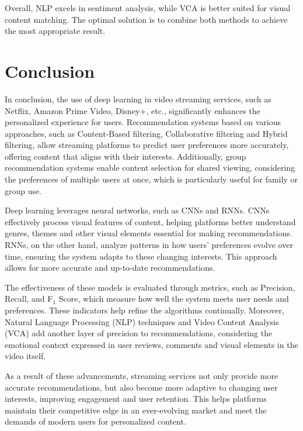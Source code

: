 \documentclass[12pt, english, a4paper]{article}
\begin{document}
Overall, NLP excels in sentiment analysis, while VCA is better suited for visual content matching. The optimal solution is to combine both methods to achieve the most appropriate result.

\section{Conclusion}

\hspace*{2em}In conclusion, the use of deep learning in video streaming services, such as Netflix, Amazon Prime Video, Disney+, etc., significantly enhances the personalized experience for users. Recommendation systems based on various approaches, such as Content-Based filtering, Collaborative filtering and Hybrid filtering, allow streaming platforms to predict user preferences more accurately, offering content that aligns with their interests. Additionally, group recommendation systems enable content selection for shared viewing, considering the preferences of multiple users at once, which is particularly useful for family or group use.

Deep learning leverages neural networks, such as CNNs and RNNs. CNNs effectively process visual features of content, helping platforms better understand genres, themes and other visual elements essential for making recommendations. RNNs, on the other hand, analyze patterns in how users' preferences evolve over time, ensuring the system adapts to these changing interests. This approach allows for more accurate and up-to-date recommendations.

The effectiveness of these models is evaluated through metrics, such as Precision, Recall, and F$_{1}$ Score, which measure how well the system meets user needs and preferences. These indicators help refine the algorithms continually. Moreover, Natural Language Processing (NLP) techniques and Video Content Analysis (VCA) add another layer of precision to recommendations, considering the emotional context expressed in user reviews, comments and visual elements in the video itself.

As a result of these advancements, streaming services not only provide more accurate recommendations, but also become more adaptive to changing user interests, improving engagement and user retention. This helps platforms maintain their competitive edge in an ever-evolving market and meet the demands of modern users for personalized content.

\printbibliography
\end{document}
